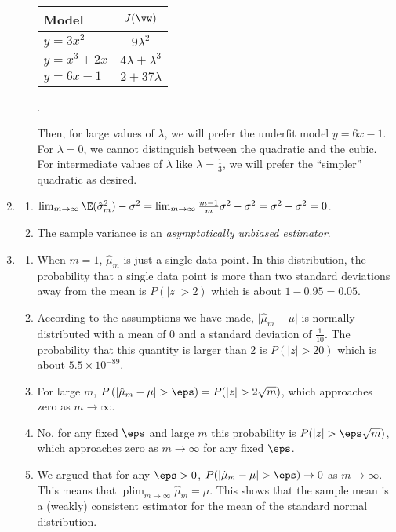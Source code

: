 \documentclass{article}
\DeclareMathOperator*{\plim}{plim}
\begin{document}
\begin{enumerate}
\begin{enumerate}
    \begin{tabular}{l|c}
    Model & $J(\vw)$ \\
    \hline
    $y = 3x^2$     & $9\lambda^2$ \\
    $y = x^3 + 2x$ & $4\lambda + \lambda^3$ \\
    $y = 6x - 1$   & $2 + 37\lambda$
    \end{tabular}.
    
    Then, for large values of $\lambda$, we will prefer the underfit model $y = 6x - 1$. For $\lambda = 0$, we cannot distinguish between the quadratic and the cubic. For intermediate values of $\lambda$ like $\lambda = \frac13$, we will prefer the ``simpler'' quadratic as desired. 
\end{enumerate}

\item \label{ML_ex_bias_solution}
\begin{enumerate}
    \item $\lim_{m\to\infty} \E(\hat{\sigma}_m^2) - \sigma^2 = \lim_{m\to\infty} \frac{m-1}{m}\sigma^2 - \sigma^2 = \sigma^2 - \sigma^2 = 0$.
    \item The sample variance is an \emph{asymptotically unbiased estimator}.
\end{enumerate}

\item \label{ML_ex_consistency_solution}
\begin{enumerate} 
    \item When $m=1$, $\hat{\mu}_m$ is just a single data point. In this distribution, the probability that a single data point is more than two standard deviations away from the mean is $P(|z| > 2)$ which is about $1 -0.95 = 0.05$.
    \item According to the assumptions we have made, $\lvert \hat{\mu}_m - \mu \rvert$ is normally distributed with a mean of 0 and a standard deviation of $\frac{1}{10}$. The probability that this quantity is larger than 2 is $P(|z| > 20)$ which is about $5.5 \times 10^{-89}$.
    \item For large $m$, $P\left(\lvert \hat{\mu}_m - \mu \rvert > \eps \right) = P(|z| > 2 \sqrt{m})$, which approaches zero as $m \to \infty$.
    \item No, for any fixed $\eps$ and large $m$ this probability is $P(|z| > \eps\sqrt{m})$, which approaches zero as $m \to \infty$ for any fixed $\eps$.
    \item We argued that for any $\eps > 0$, $P(\lvert \hat{\mu}_m - \mu \rvert > \eps) \to 0$ as $m \to \infty$. This means that $\plim_{m \to \infty} \hat{\mu}_m = \mu$. This shows that the sample mean is a (weakly) consistent estimator for the mean of the standard normal distribution.
\end{enumerate}


\end{enumerate}
\end{document}
